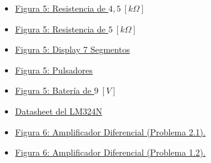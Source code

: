 \documentclass[12pt,a4paper]{article}
\begin{document}
\begin{itemize}
    \item \href{https://www.digikey.com/es/products/detail/stackpole-electronics-inc/RNF14DBC4K53/17508300}{Figura 5: Resistencia de $4,5 \ [k \Omega]$}
    \item \href{https://www.digikey.com/es/products/detail/stackpole-electronics-inc/RNF14DBC4K99/17509105}{Figura 5: Resistencia de $5 \ [k \Omega]$}
    \item \href{https://www.digikey.com/es/products/detail/liteon/LSHD-5503/560009}{Figura 5: Display 7 Segmentos}
    \item \href{https://www.digikey.com/es/products/detail/c-k/Y41A00521FPLFS/1466352}{Figura 5: Pulsadores}
    \item \href{https://www.digikey.com/es/products/detail/energizer-battery-company/A1604-BK210J/11615674}{Figura 5: Batería de $9 \ [V]$}
    \item \href{https://www.alldatasheet.com/datasheet-pdf/view/17880/PHILIPS/LM324N.html}{Datasheet del LM324N}
    \item \href{https://fcefyn.aulavirtual.unc.edu.ar/pluginfile.php/951691/mod_resource/content/1/Gu%C3%ADa%20de%20Problemas%20Sintesis%20Redes%20Activas%202025.pdf}{Figura 6: Amplificador Diferencial (Problema 2.1).}
    \item \href{https://fcefyn.aulavirtual.unc.edu.ar/pluginfile.php/951691/mod_resource/content/1/Gu%C3%ADa%20de%20Problemas%20Sintesis%20Redes%20Activas%202025.pdf}{Figura 6: Amplificador Diferencial (Problema 1.2).}
\end{itemize}
\end{document}
